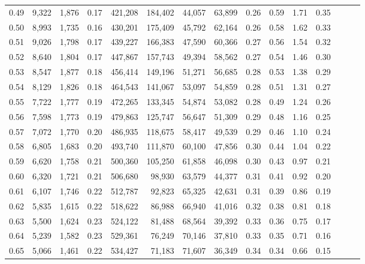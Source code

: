 \begin{tabular}{rrrrrrrrrrrrrrr}
0.49 &   9,322 &  1,876 &  0.17 &  421,208 &  184,402 &   44,057 &   63,899 &  0.26 &  0.59 &  1.71 &      0.35 \\
0.50 &   8,993 &  1,735 &  0.16 &  430,201 &  175,409 &   45,792 &   62,164 &  0.26 &  0.58 &  1.62 &      0.33 \\
0.51 &   9,026 &  1,798 &  0.17 &  439,227 &  166,383 &   47,590 &   60,366 &  0.27 &  0.56 &  1.54 &      0.32 \\
0.52 &   8,640 &  1,804 &  0.17 &  447,867 &  157,743 &   49,394 &   58,562 &  0.27 &  0.54 &  1.46 &      0.30 \\
0.53 &   8,547 &  1,877 &  0.18 &  456,414 &  149,196 &   51,271 &   56,685 &  0.28 &  0.53 &  1.38 &      0.29 \\
0.54 &   8,129 &  1,826 &  0.18 &  464,543 &  141,067 &   53,097 &   54,859 &  0.28 &  0.51 &  1.31 &      0.27 \\
0.55 &   7,722 &  1,777 &  0.19 &  472,265 &  133,345 &   54,874 &   53,082 &  0.28 &  0.49 &  1.24 &      0.26 \\
0.56 &   7,598 &  1,773 &  0.19 &  479,863 &  125,747 &   56,647 &   51,309 &  0.29 &  0.48 &  1.16 &      0.25 \\
0.57 &   7,072 &  1,770 &  0.20 &  486,935 &  118,675 &   58,417 &   49,539 &  0.29 &  0.46 &  1.10 &      0.24 \\
0.58 &   6,805 &  1,683 &  0.20 &  493,740 &  111,870 &   60,100 &   47,856 &  0.30 &  0.44 &  1.04 &      0.22 \\
0.59 &   6,620 &  1,758 &  0.21 &  500,360 &  105,250 &   61,858 &   46,098 &  0.30 &  0.43 &  0.97 &      0.21 \\
0.60 &   6,320 &  1,721 &  0.21 &  506,680 &   98,930 &   63,579 &   44,377 &  0.31 &  0.41 &  0.92 &      0.20 \\
0.61 &   6,107 &  1,746 &  0.22 &  512,787 &   92,823 &   65,325 &   42,631 &  0.31 &  0.39 &  0.86 &      0.19 \\
0.62 &   5,835 &  1,615 &  0.22 &  518,622 &   86,988 &   66,940 &   41,016 &  0.32 &  0.38 &  0.81 &      0.18 \\
0.63 &   5,500 &  1,624 &  0.23 &  524,122 &   81,488 &   68,564 &   39,392 &  0.33 &  0.36 &  0.75 &      0.17 \\
0.64 &   5,239 &  1,582 &  0.23 &  529,361 &   76,249 &   70,146 &   37,810 &  0.33 &  0.35 &  0.71 &      0.16 \\
0.65 &   5,066 &  1,461 &  0.22 &  534,427 &   71,183 &   71,607 &   36,349 &  0.34 &  0.34 &  0.66 &      0.15 \\

\end{tabular}
